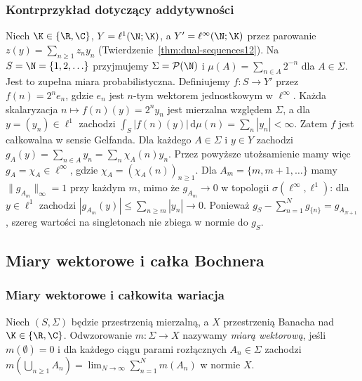 \subsubsection{Kontrprzykład dotyczący addytywności}

\begin{przyklad}
\label{ex:gelfand-weakstar15b}
Niech $\K\in\{\R,\C\}$, $Y=\ell^1(\N;\K)$,
a $Y'=\ell^\infty(\N;\K)$ przez parowanie
$z(y)=\sum_{n\ge1}z_ny_n$ (Twierdzenie~\ref{thm:dual-sequences12}).
Na $S=\N=\{1,2,\ldots\}$ przyjmujemy
$\Sigma=\mathcal P(\N)$ i $\mu(A)=\sum_{n\in A}2^{-n}$
dla $A\in\Sigma$. Jest to zupełna miara probabilistyczna.
Definiujemy $f:S\to Y'$ przez $f(n)=2^ne_n$,
gdzie $e_n$ jest $n$-tym wektorem jednostkowym w $\ell^\infty$.
Każda skalaryzacja $n\mapsto f(n)(y)=2^ny_n$ jest mierzalna
względem $\Sigma$, a dla $y=(y_n)\in\ell^1$ zachodzi
$\int_S|f(n)(y)|\,\mathrm d\mu(n)=\sum_n|y_n|<\infty$.
Zatem $f$ jest całkowalna w sensie Gelfanda.
Dla każdego $A\in\Sigma$ i $y\in Y$ zachodzi
$g_A(y)=\sum_{n\in A}y_n=\sum_n\chi_A(n)y_n$.
Przez powyższe utożsamienie mamy więc
$g_A=\chi_A\in\ell^\infty$, gdzie
$\chi_A=(\chi_A(n))_{n\ge1}$. Dla $A_m=\{m,m+1,\ldots\}$
mamy $\|g_{A_m}\|_\infty=1$ przy każdym $m$, mimo że
$g_{A_m}\to0$ w topologii $\sigma(\ell^\infty,\ell^1)$:
dla $y\in\ell^1$ zachodzi
$|g_{A_m}(y)|\le\sum_{n\ge m}|y_n|\to0$.
Ponieważ $g_S-\sum_{n=1}^N g_{\{n\}}=g_{A_{N+1}}$,
szereg wartości na singletonach nie zbiega w normie do $g_S$.
\end{przyklad}

\subsection{Miary wektorowe i całka Bochnera}

\subsubsection{Miary wektorowe i całkowita wariacja}

\begin{definicja}
\label{def:vector-measure15b}
Niech $(S,\Sigma)$ będzie przestrzenią mierzalną, a $X$
przestrzenią Banacha nad $\K\in\{\R,\C\}$.
Odwzorowanie $m:\Sigma\to X$ nazywamy \emph{miarą wektorową},
jeśli $m(\emptyset)=0$ i dla każdego ciągu parami rozłącznych
$A_n\in\Sigma$ zachodzi
$m(\bigcup_{n\ge1}A_n)=\lim_{N\to\infty}\sum_{n=1}^Nm(A_n)$
w normie $X$.
\end{definicja}


